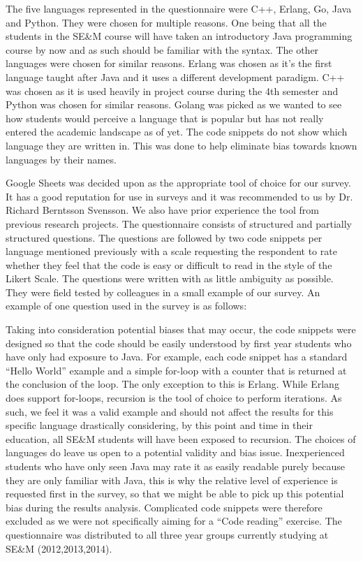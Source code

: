 \documentclass[10pt,twocolumn]{article}
\begin{document}

The five languages represented in the questionnaire were C++, Erlang, Go, Java and Python. They were chosen for multiple reasons. One being that all the students in the SE\&M course will have taken an introductory Java programming course by now and as such should be familiar with the syntax. The other languages were chosen for similar reasons. Erlang was chosen as it's the first language taught after Java and it uses a different development paradigm. C++ was chosen as it is used heavily in project course during the 4th semester and Python was chosen for similar reasons. Golang was picked as we wanted to see how students would perceive a language that is popular but has not really entered the academic landscape as of yet. The code snippets do not show which language they are written in. This was done to help eliminate bias towards known languages by their names.

Google Sheets was decided upon as the appropriate tool of choice for our survey. It has a good reputation for use in surveys and it was recommended to us by Dr. Richard Berntsson Svensson. We also have prior experience the tool from previous research projects.
The questionnaire consists of structured and partially structured questions. The questions are followed by two code snippets per language mentioned previously with a scale requesting the respondent to rate whether they feel that the code is easy or difficult to read in the style of the Likert Scale. The questions were written with as little ambiguity as possible. They were field tested by colleagues in a small example of our survey. An example of one question used in the survey is as follows:

Taking into consideration potential biases that may occur, the code snippets were designed so that the code should be easily understood by first year students who have only had exposure to Java. For example, each code snippet has a standard ``Hello World'' example and a simple for-loop with a counter that is returned at the conclusion of the loop. The only exception to this is Erlang. While Erlang does support for-loops, recursion is the tool of choice to perform iterations. As such, we feel it was a valid example and should not affect the results for this specific language drastically considering, by this point and time in their education, all SE\&M students will have been exposed to recursion. The choices of languages do leave us open to a potential validity and bias issue. Inexperienced students who have only seen Java may rate it as easily readable purely because they are only familiar with Java, this is why the relative level of experience is requested first in the survey, so that we might be able to pick up this potential bias during the results analysis. Complicated code snippets were therefore excluded as we were not specifically aiming for a ``Code reading'' exercise. The questionnaire was distributed to all three year groups currently studying at SE\&M (2012,2013,2014).
\end{document}
